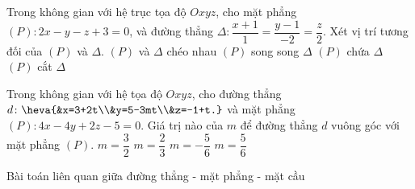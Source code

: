 	\begin{ex}%
	Trong không gian với hệ trục tọa độ $Oxyz$, cho mặt phẳng $(P)\colon2x-y-z+3=0$, và đường thẳng $\Delta\colon\dfrac{x+1}{1}=\dfrac{y-1}{-2}=\dfrac{z}{2}$. Xét vị trí tương đối của $(P)$ và $\Delta$. 
	\choice
	{$(P)$ và $\Delta$ chéo nhau}
	{$(P)$ song song $\Delta$}
	{$(P)$ chứa $\Delta$}
	{\True $(P)$ cắt $\Delta$}
	\end{ex}
	\begin{ex}%
	Trong không gian với hệ tọa độ $Oxyz$, cho đường thẳng $d\colon\heva{&x=3+2t\\&y=5-3mt\\&z=-1+t.}$ và mặt phẳng $(P)\colon4x-4y+2z-5=0$. Giá trị nào của $m$ để đường thẳng $d$ vuông góc với mặt phẳng $(P)$. 
	\choice
	{$m=\dfrac{3}{2}$}
	{\True $m=\dfrac{2}{3}$}
	{$m=-\dfrac{5}{6}$}
	{$m=\dfrac{5}{6}$}
	\end{ex}
	\begin{dang}{Bài toán liên quan giữa đường thẳng - mặt phẳng - mặt cầu}%
	\end{dang}
 \setcounter{subsubsection}{0}
 \setcounter{vd}{0}
 \setcounter{ex}{0}
